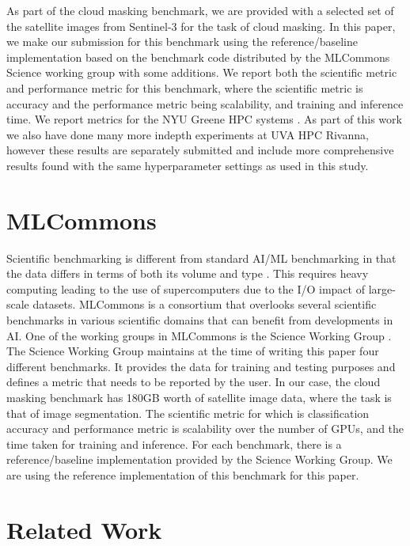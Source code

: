 \documentclass[sigplan,screen]{acmart}
\begin{document}
As part of the cloud masking benchmark, we are provided with  a selected set of the satellite images from Sentinel-3 for the task of cloud masking. In this paper, we make our submission for this benchmark using the reference/baseline implementation based on the benchmark code distributed by the MLCommons Science working group with some additions. We report both the scientific metric and performance metric for this benchmark, where the scientific metric is accuracy and the performance metric being scalability, and training and inference time. We report metrics for the NYU Greene HPC systems \cite{www-greene}. As part of this work we also have done many more indepth experiments at UVA HPC Rivanna, however these results are separately submitted and include more comprehensive results found with the same hyperparameter settings as used in this study.

\section{MLCommons}

Scientific benchmarking is different from standard AI/ML benchmarking in that the data differs in terms of both its volume and type \cite{las-2023-mlcommons-edu-eq}. This requires heavy computing leading to the use of supercomputers  \cite{Farrell2021MLPerfHA} due to the I/O impact of large-scale datasets. MLCommons is a consortium that overlooks several scientific benchmarks in various scientific domains that can benefit from developments in AI. One of the working groups in MLCommons is the Science Working Group \cite{Thiyagalingam2022AIBF}. The Science Working Group maintains at the time of writing this paper four different benchmarks. It provides the data for training and testing purposes and defines a metric that needs to be reported by the user. In our case, the cloud masking benchmark has 180GB worth of satellite image data, where the task is that of image segmentation. The scientific metric for which is classification accuracy and performance metric is scalability over the number of GPUs, and the time taken for training and inference. 
For each benchmark, there is a reference/baseline implementation provided by the Science Working Group. We are using the reference implementation of this benchmark for this paper.

\section{Related Work}
\end{document}
